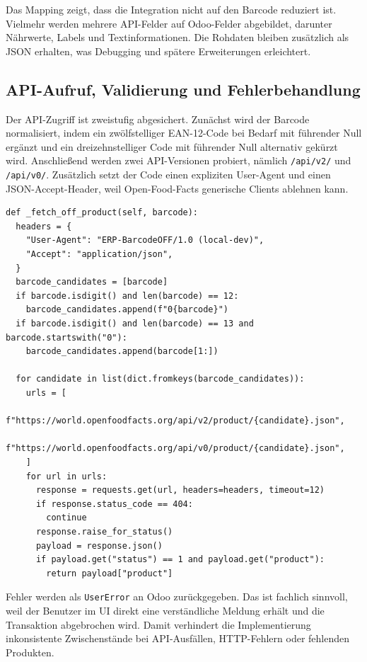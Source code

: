 \documentclass[12pt,a4paper]{article}
\begin{document}
Das Mapping zeigt, dass die Integration nicht auf den Barcode reduziert ist. Vielmehr werden mehrere API-Felder auf Odoo-Felder abgebildet, darunter Nährwerte, Labels und Textinformationen. Die Rohdaten bleiben zusätzlich als JSON erhalten, was Debugging und spätere Erweiterungen erleichtert.

\subsection{API-Aufruf, Validierung und Fehlerbehandlung}

Der API-Zugriff ist zweistufig abgesichert. Zunächst wird der Barcode normalisiert, indem ein zwölfstelliger EAN-12-Code bei Bedarf mit führender Null ergänzt und ein dreizehnstelliger Code mit führender Null alternativ gekürzt wird. Anschließend werden zwei API-Versionen probiert, nämlich \texttt{/api/v2/} und \texttt{/api/v0/}. Zusätzlich setzt der Code einen expliziten User-Agent und einen JSON-Accept-Header, weil Open-Food-Facts generische Clients ablehnen kann.

\begin{lstlisting}[caption={Robuster Abruf von Open-Food-Facts-Daten}, label={lst:off-fetch}]
def _fetch_off_product(self, barcode):
  headers = {
    "User-Agent": "ERP-BarcodeOFF/1.0 (local-dev)",
    "Accept": "application/json",
  }
  barcode_candidates = [barcode]
  if barcode.isdigit() and len(barcode) == 12:
    barcode_candidates.append(f"0{barcode}")
  if barcode.isdigit() and len(barcode) == 13 and barcode.startswith("0"):
    barcode_candidates.append(barcode[1:])

  for candidate in list(dict.fromkeys(barcode_candidates)):
    urls = [
      f"https://world.openfoodfacts.org/api/v2/product/{candidate}.json",
      f"https://world.openfoodfacts.org/api/v0/product/{candidate}.json",
    ]
    for url in urls:
      response = requests.get(url, headers=headers, timeout=12)
      if response.status_code == 404:
        continue
      response.raise_for_status()
      payload = response.json()
      if payload.get("status") == 1 and payload.get("product"):
        return payload["product"]
\end{lstlisting}

Fehler werden als \texttt{UserError} an Odoo zurückgegeben. Das ist fachlich sinnvoll, weil der Benutzer im UI direkt eine verständliche Meldung erhält und die Transaktion abgebrochen wird. Damit verhindert die Implementierung inkonsistente Zwischenstände bei API-Ausfällen, HTTP-Fehlern oder fehlenden Produkten.
\end{document}
